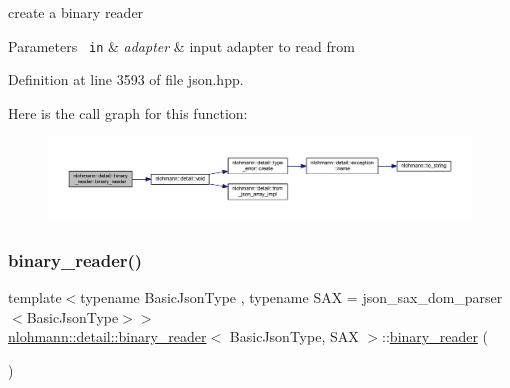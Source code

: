create a binary reader 


\begin{DoxyParams}[1]{Parameters}
\mbox{\texttt{ in}}  & {\em adapter} & input adapter to read from \\
\hline
\end{DoxyParams}


Definition at line 3593 of file json.\+hpp.

Here is the call graph for this function\+:
\nopagebreak
\begin{figure}[H]
\begin{center}
\leavevmode
\includegraphics[width=350pt]{classnlohmann_1_1detail_1_1binary__reader_aed84f0302eb232d3b69f7653bef2337a_cgraph}
\end{center}
\end{figure}
\mbox{\label{classnlohmann_1_1detail_1_1binary__reader_aacbece7dfa1698dfb3f22c90922d7244}} 
\subsubsection{\texorpdfstring{binary\_reader()}{binary\_reader()}\hspace{0.1cm}{\footnotesize\ttfamily [2/3]}}
{\footnotesize\ttfamily template$<$typename Basic\+Json\+Type , typename S\+AX  = json\+\_\+sax\+\_\+dom\+\_\+parser$<$\+Basic\+Json\+Type$>$$>$ \\
\mbox{\hyperlink{classnlohmann_1_1detail_1_1binary__reader}{nlohmann\+::detail\+::binary\+\_\+reader}}$<$ Basic\+Json\+Type, S\+AX $>$\+::\mbox{\hyperlink{classnlohmann_1_1detail_1_1binary__reader}{binary\+\_\+reader}} (\begin{DoxyParamCaption}\item[{const \mbox{\hyperlink{classnlohmann_1_1detail_1_1binary__reader}{binary\+\_\+reader}}$<$ Basic\+Json\+Type, S\+AX $>$ \&}]{ }\end{DoxyParamCaption})\hspace{0.3cm}{\ttfamily [delete]}}

